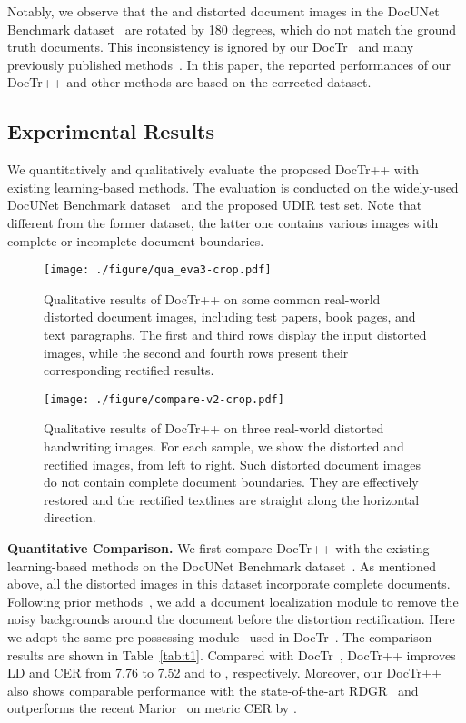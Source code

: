 \documentclass[lettersize,journal]{IEEEtran}
\begin{document}
Notably, we observe that the  and  distorted document images in the DocUNet Benchmark dataset~\cite{8578592} are rotated by 180 degrees,
which do not match the ground truth documents.
This inconsistency is ignored by our DocTr~\cite{feng2021doctr} and many previously published methods~\cite{9010747,das2021end,feng2021doctr,jiang2022revisiting,liu2020geometric,8578592,xie2021document,xie2020dewarping,xue2022fourier,markovitz2020can,ma2022learning,zhang2022marior,li2019document}.
In this paper,
the reported performances of our DocTr++ and other methods are based on the corrected dataset.

\subsection{Experimental Results}
We quantitatively and qualitatively evaluate the proposed DocTr++ with existing learning-based methods.
The evaluation is conducted on the widely-used DocUNet Benchmark dataset~\cite{8578592} and the proposed UDIR test set.
Note that different from the former dataset, the latter one contains various images with complete or incomplete document boundaries.

\begin{figure*}[t]
  \centering
  \texttt{[image: ./figure/qua\_eva3-crop.pdf]}
  \caption{Qualitative results of DocTr++ on some common real-world distorted document images, including test papers, book pages, and text paragraphs. The first and third rows display the input distorted images, while the second and fourth rows present their corresponding rectified results.}
  \label{fig:qua_eva2}
\end{figure*}

\begin{figure*}[t]
  \centering
  \texttt{[image: ./figure/compare-v2-crop.pdf]}
  \caption{Qualitative results of DocTr++ on three real-world distorted handwriting images. For each sample, we show the distorted and rectified images, from left to right. Such distorted document images do not contain complete document boundaries. They are effectively restored and the rectified textlines are straight along the horizontal direction.
  }
  \label{fig:hand}
\end{figure*}

\smallskip
\textbf{Quantitative Comparison.}
We first compare DocTr++ with the existing learning-based methods on the DocUNet Benchmark dataset~\cite{8578592}. As mentioned above, all the distorted images in this dataset incorporate complete documents. Following prior methods~\cite{feng2021doctr,feng2022geometric,feng2021docscanner,xie2020dewarping,zhang2022marior}, we add a document localization module to remove the noisy backgrounds around the document before the distortion rectification.
Here we adopt the same pre-possessing module~\cite{Qin_2020} used in DocTr~\cite{feng2021doctr}.
The comparison results are shown in Table~\ref{tab:t1}.
Compared with DocTr~\cite{feng2021doctr},
DocTr++ improves LD and CER from 7.76 to 7.52 and  to , respectively.
Moreover, our DocTr++ also shows comparable performance with the state-of-the-art RDGR~\cite{jiang2022revisiting} and outperforms the recent Marior~\cite{zhang2022marior} on metric CER by .
\end{document}
